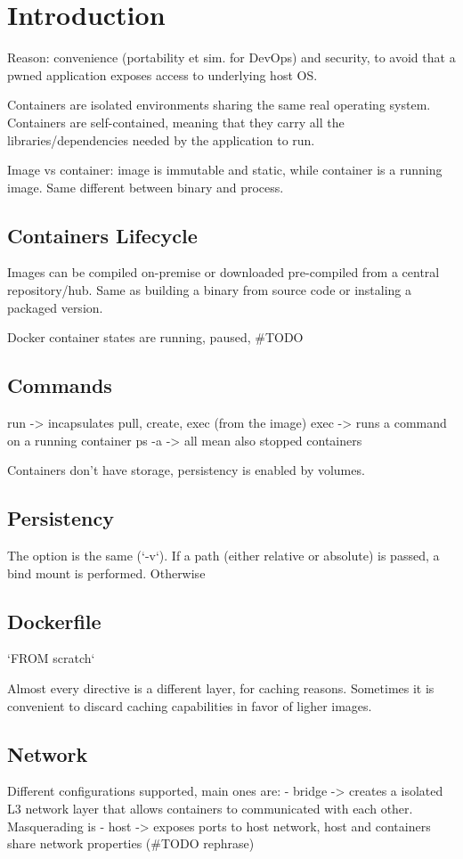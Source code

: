 \section{Introduction}
Reason: convenience (portability et sim. for DevOps) and security, to avoid that a pwned application exposes access to underlying host OS.

Containers are isolated environments sharing the same real operating system.
Containers are self-contained, meaning that they carry all the libraries/dependencies needed by the application to run.

Image vs container: image is immutable and static, while container is a running image. Same different between binary and process.

\subsection{Containers Lifecycle}
Images can be compiled on-premise or downloaded pre-compiled from a central repository/hub.
Same as building a binary from source code or instaling a packaged version.

Docker container states are running, paused, #TODO

\subsection{Commands}
run -> incapsulates pull, create, exec (from the image)
exec -> runs a command on a running container
ps -a -> all mean also stopped containers

Containers don't have storage, persistency is enabled by volumes.

\subsection{Persistency}
The option is the same (`-v`). If a path (either relative or absolute) is passed, a bind mount is performed. Otherwise 


\subsection{Dockerfile}
`FROM scratch`

Almost every directive is a different layer, for caching reasons.
Sometimes it is convenient to discard caching capabilities in favor of ligher images.

\subsection{Network}
Different configurations supported, main ones are:
 - bridge -> creates a isolated L3 network layer that allows containers to communicated with each other. Masquerading is 
 - host -> exposes ports to host network, host and containers share network properties (#TODO rephrase)

